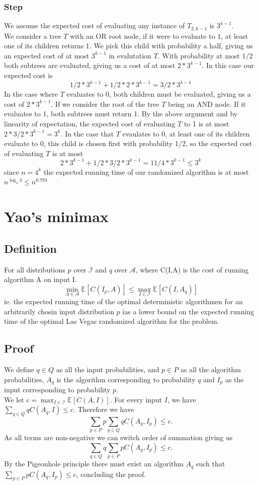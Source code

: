 \documentclass[a4paper, fleqn]{article}
\def\A{\mathcal{A}}
\def\I{\mathcal{I}}
\def\E{\mathbb{E}}
\begin{document}
\subsubsection*{Step}
We assume the expected cost of evaluating any instance of $T_{2,k-1}$ is $3^{k-1}$.\\
We consider a tree $T$ with an OR root node, if it were to evaluate to 1, at least one of its children returns 1. We pick this child with probability a half, giving us an expected cost of at most $3^{k-1}$ in evalutation $T$. With probability at most $1/2$ both subtrees are evaluated, giving us a cost of at most $2 * 3^{k-1}$. In this case our expected cost is
$$
1/2 * 3^{k-1} + 1/2 * 2 * 3^{k-1} = 3/2 * 3^{k-1}
$$
In the case where $T$ evaluates to 0, both children must be evaluated, giving us a cost of $2 * 3^{k-1}$.
If we consider the root of the tree $T$ being an AND node. If it evaluates to 1, both subtrees must return 1. By the above argument and by linearity of expectation, the expected cost of evaluating $T$ to 1 is at most $2 * 3/2 * 3^{k-1} = 3^k$. In the case that $T$ evaulates to 0, at least one of its children evaluate to 0, this child is chosen first with probability 1/2, so the expected cost of evaluating $T$ is at most
$$
2*3^{k-1} + 1/2 * 3/2 * 3^{k-1} = 11/4 * 3^{k-1} \leq 3^k
$$
since $n= 4^k$ the expected running time of our randomized algorithm is at most $n^{\log_4 3} \leq n^{0.793}$
\section{Yao's minimax}
\subsection{Definition}
For all distributions $p$ over $\I$ and $q$ over $\A$, where C(I,A) is the cost of running algorithm A on input I.
$$
\min_{A \in \A} \E[C(I_p, A)] \leq \max_{I\in\I} \E[C(I,A_q)]
$$
ie. the expected running time of the optimal deterministic algorithmen for an arbitrarily chosin input distribution $p$ ias a lower bound on the expected running time of the optimal Las Vegas randomized algorithm for the problem.
\subsection{Proof}
We define $q \in Q$ as all the input probabilities, and $p\in P$ as all the algorithm probabilities, $A_q$ is the algorithm corresponding to probability $q$ and $I_p$ as the input corresponding to probability $p$.\\
We let $c = \max_{I\in\I} \E[C(A,I)]$. For every input $I$, we have $\sum_{q \in Q} q C(A_q,I) \leq c$. Therefore we have
$$\sum_{p \in P} p \sum_{q \in Q} q C(A_q,I_p) \leq c.$$
As all terms are non-negative we can switch order of summation giving us
$$\sum_{q \in Q} q \sum_{p \in P} p C(A_q,I_p) \leq c.$$
By the Pigeonhole principle there must exist an algorithm $A_q$ such that $\sum_{p \in P} p C(A_q,I_p) \leq c$, concluding the proof.
\end{document}
